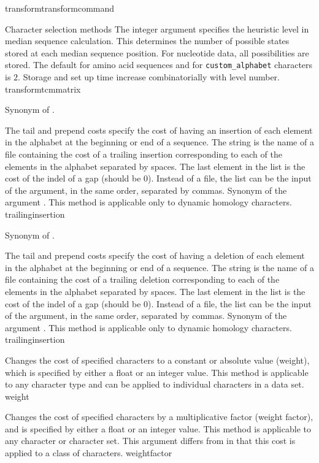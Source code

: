 \begin{command}{transform}{transformcommand}
\begin{arguments}
\begin{argumentgroup}{Character selection methods}
{The integer argument specifies the heuristic level in median sequence 
calculation. This determines the number of possible states stored at 
each median sequence position. For nucleotide data, all possibilities 
are stored. The default for amino acid sequences and for 
\texttt{custom\_alphabet} characters is $2$. Storage and set up time 
increase combinatorially with level number.}
{transformtcmmatrix}

{Synonym of .}
{}

{The tail and prepend costs specify the cost of having an insertion of
each element in the alphabet at the beginning or end
of a sequence. The string is the name of a file containing the cost of
a trailing insertion corresponding to each of the elements
in the alphabet separated by spaces. The last element in the list is the
cost of the indel of a gap (should be 0). Instead of a file, the list can
be the input of the argument, in the same order, separated by commas.
Synonym of the argument . This method is applicable 
only to dynamic homology characters.} 
{trailinginsertion}

{Synonym of .}
{}

{The tail and prepend costs specify the cost of having a deletion
of each element in the alphabet at the beginning or end
of a sequence. The string is the name of a file containing the cost of
a trailing deletion corresponding to each of the elements
in the alphabet separated by spaces. The last element in the list is the
cost of the indel of a gap (should be 0). Instead of a file, the list can
be the input of the argument, in the same order, separated by commas.
Synonym of the argument . This method is applicable 
only to dynamic homology characters.} 
{trailinginsertion}

{Changes the cost of specified characters to a constant or absolute value 
(weight), which is specified by either a float or an integer value. 
This method is applicable to any character type and can be applied to individual 
characters in a data set.} 
{weight}

{Changes the cost of specified characters by a multiplicative factor (weight factor), 
and is specified by either a float or an integer value. This method is applicable to any 
character or character set. This argument differs from  in that 
this cost is applied to a class of characters.} 
{weightfactor}


\end{argumentgroup}
\end{arguments}
\end{command}
